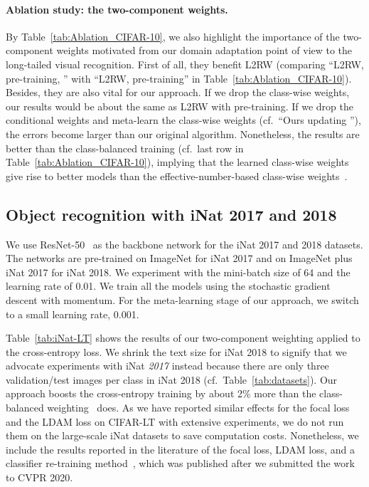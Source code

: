 \vspace{-10pt}
\paragraph{Ablation study: the two-component weights.}
By Table~\ref{tab:Ablation_CIFAR-10}, we also highlight the importance of the two-component weights  motivated from our domain adaptation point of view to the long-tailed visual recognition. First of all, they benefit L2RW (comparing ``L2RW, pre-training, '' with ``L2RW, pre-training'' in Table~\ref{tab:Ablation_CIFAR-10}). Besides, they are also vital for our approach. If we drop the class-wise weights, our results would be about the same as L2RW with pre-training. If we drop the conditional weights and meta-learn the class-wise weights (cf.\ ``Ours updating ''), the errors become larger than our original algorithm. Nonetheless, the results are better than the class-balanced training (cf.\ last row in Table~\ref{tab:Ablation_CIFAR-10}), implying that the learned class-wise weights give rise to better models than the effective-number-based class-wise weights~\cite{CBLoss}. 






\subsection{Object recognition with iNat 2017 and 2018}
We use ResNet-50~\cite{Resnet} as the backbone network for the iNat 2017 and 2018 datasets. The networks are pre-trained on ImageNet for iNat 2017 and on ImageNet plus iNat 2017 for iNat 2018.  We experiment with the mini-batch size of 64 and the learning rate of 0.01. We train all the models using the stochastic gradient descent with momentum. For the meta-learning stage of our approach, we switch to a small learning rate, 0.001. 


Table~\ref{tab:iNat-LT} shows the results of our two-component weighting applied to the cross-entropy loss. We shrink the text size for iNat 2018 to signify that we advocate experiments with iNat \textit{2017} instead  because there are only three validation/test images per class in iNat 2018 (cf.\  Table~\ref{tab:datasets}). Our approach boosts the cross-entropy training by about 2\% more than the class-balanced weighting~\cite{CBLoss} does. As we have reported similar effects for the focal loss and the LDAM loss on CIFAR-LT with extensive experiments, we do not run them on the large-scale iNat datasets to save computation costs. Nonetheless, we include the results reported in the literature of the focal loss, LDAM loss, and a classifier re-training method~\cite{kang2019decoupling}, which was published after we submitted the work to CVPR 2020.



